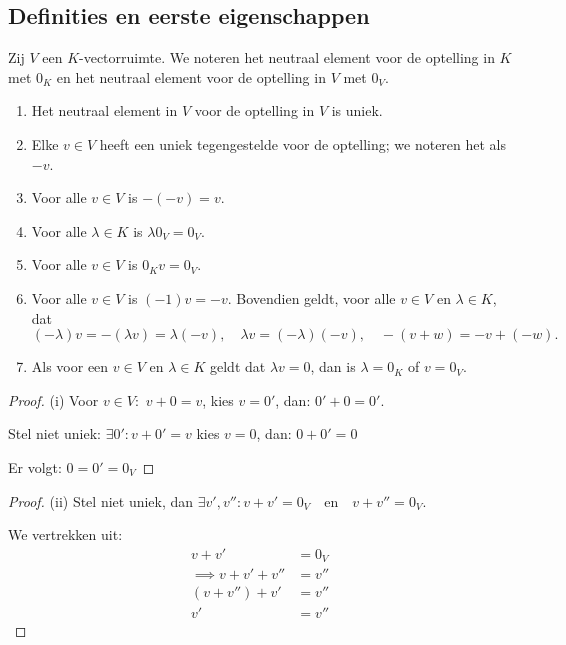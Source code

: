 \subsection{Definities en eerste eigenschappen}

\begin{lemma}[2.1.3]
    Zij $V$ een $K$-vectorruimte. We noteren het neutraal element voor de optelling in $K$ met $0_K$ en het neutraal element voor de optelling in $V$ met $0_V$.
    \begin{enumerate}
        \item[(i)] Het neutraal element in $V$ voor de optelling in $V$ is uniek.
        \item[(ii)] Elke $v \in V$ heeft een uniek tegengestelde voor de optelling; we noteren het als $-v$.
        \item[(iii)] Voor alle $v \in V$ is $-(-v) = v$.
        \item[(iv)] Voor alle $\lambda \in K$ is $\lambda 0_V = 0_V$.
        \item[(v)] Voor alle $v \in V$ is $0_K v = 0_V$.
        \item[(vi)] Voor alle $v \in V$ is $(-1)v = -v$. Bovendien geldt, voor alle $v \in V$ en $\lambda \in K$, dat
        \[ (-\lambda)v = -(\lambda v) = \lambda(-v), \quad \lambda v = (-\lambda)(-v), \quad -(v + w) = -v + (-w). \]
        \item[(vii)] Als voor een $v \in V$ en $\lambda \in K$ geldt dat $\lambda v = 0$, dan is $\lambda = 0_K$ of $v = 0_V$.
    \end{enumerate}
\end{lemma}
\begin{proof}(i)
    Voor \(v \in V: \) \(v + 0 = v \), kies \(v=0'\), dan:
     \(0'+ 0 = 0'.\)

    Stel niet uniek:
    \(\exists 0' : v + 0' = v\) kies \(v = 0\), dan:
    \(0 + 0' = 0\)

    Er volgt: \(0 = 0' = 0_V\)
\end{proof}
\begin{proof}(ii)
    Stel niet uniek, dan \(\exists v', v'': v + v' = 0_V \quad \text{en} \quad v + v'' = 0_V\).
    
    We vertrekken uit:
    \begin{align*}
        v + v' 
        &= 0_V \\
        \implies
        v + v'+ v'' &= v'' \\
        (v+v'')+v' &= v'' \\
        v'&=v'' 
    \end{align*}
\end{proof}
